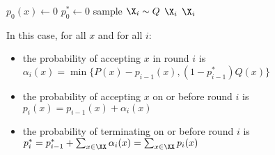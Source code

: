\documentclass[class=co432,notes,tikz]{agony}
\begin{document}
\begin{algorithm}[H]
  \caption{}
  \begin{algorithmic}[1]
     $p_0(x) \gets 0$ \EndFor
    \State $p_0^* \gets 0$
      \State sample $\X_i \sim Q$
          \State \Return $\X_i$
        \EndProb
      \Else{}
          \State \Return $\X_i$
        \EndProb
      \EndIf
    \EndFor
  \end{algorithmic}
\end{algorithm}

In this case, for all $x$ and for all $i$:
\begin{itemize}[nosep]
  \item the probability of accepting $x$ in round $i$
        is $\alpha_i(x) = \min\{P(x) - p_{i-1}(x), (1-p_{i-1}^*)Q(x)\}$
  \item the probability of accepting $x$ on or before round $i$ is
        $p_i(x) = p_{i-1}(x) + \alpha_i(x)$
  \item the probability of terminating on or before round $i$ is
        $p_i^* = p_{i-1}^* + \sum_{x \in \XX} \alpha_i(x) = \sum_{x \in \XX} p_i(x)$
\end{itemize}
\end{document}
